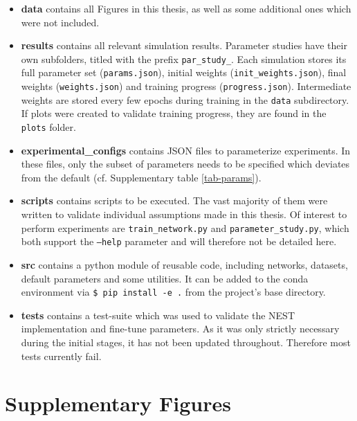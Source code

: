 \begin{itemize}
  \item \textbf{data} contains all Figures in this thesis, as well as some additional ones which were not
  included.
  \item \textbf{results} contains all relevant simulation results. Parameter studies have their own subfolders, titled
        with the prefix \texttt{par\_study\_}. Each simulation stores its full parameter set (\texttt{params.json}), initial
        weights (\texttt{init\_weights.json}), final weights (\texttt{weights.json}) and training progress
        (\texttt{progress.json}). Intermediate weights are stored every few epochs during training in the \texttt{data}
        subdirectory. If plots were created to validate training progress, they are found in the \texttt{plots} folder.
  \item \textbf{experimental\_configs} contains JSON files to parameterize experiments. In these files, only the subset
        of parameters needs to be specified which deviates from the default (cf. Supplementary table \ref{tab-params}).
  \item \textbf{scripts} contains scripts to be executed. The vast majority of them were written to validate individual
        assumptions made in this thesis. Of interest to perform experiments are \texttt{train\_network.py} and
        \texttt{parameter\_study.py}, which both support the \texttt{--help} parameter and will therefore not be detailed
        here.
  \item \textbf{src} contains a python module of reusable code, including networks, datasets, default parameters and
        some utilities. It can be added to the conda environment via \texttt{\$ pip install -e .} from the project's base
        directory.
  \item \textbf{tests} contains a test-suite which was used to validate the NEST implementation and fine-tune
        parameters. As it was only strictly necessary during the initial stages, it has not been updated throughout. Therefore
        most tests currently fail.
\end{itemize}


\newpage
\section{Supplementary Figures}


